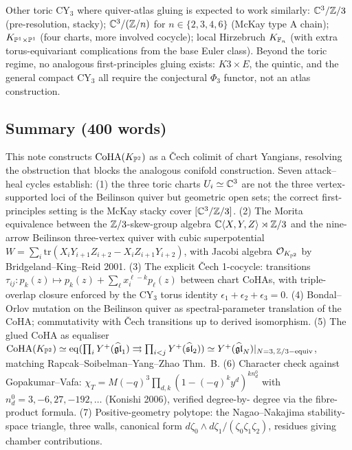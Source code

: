 Other toric CY$_3$ where quiver-atlas gluing is expected to work
similarly: $\mathbb{C}^3/\mathbb{Z}/3$ (pre-resolution, stacky); $\mathbb{C}^3/(\mathbb{Z}/n)$ for
$n\in\{2,3,4,6\}$ (McKay type A chain); $K_{\mathbb{P}^1\times\mathbb{P}^1}$ (four
charts, more involved cocycle); local Hirzebruch $K_{\mathbb{F}_n}$ (with
extra torus-equivariant complications from the base Euler class).
Beyond the toric regime, no analogous first-principles gluing exists:
$K3\times E$, the quintic, and the general compact CY$_3$ all require
the conjectural $\Phi_3$ functor, not an atlas construction.

\subsection*{Summary (400 words)}

This note constructs $\mathrm{CoHA}(K_{\mathbb{P}^2})$ as a \v Cech colimit of chart
Yangians, resolving the obstruction that blocks the analogous conifold
construction. Seven attack--heal cycles establish: (1) the three toric
charts $U_i\simeq\mathbb{C}^3$ are not the three vertex-supported loci of the
Beilinson quiver but geometric open sets; the correct first-principles
setting is the McKay stacky cover $[\mathbb{C}^3/\mathbb{Z}/3]$. (2) The Morita
equivalence between the $\mathbb{Z}/3$-skew-group algebra
$\mathbb{C}\langle X,Y,Z\rangle\rtimes\mathbb{Z}/3$ and the nine-arrow Beilinson
three-vertex quiver with cubic superpotential $W=\sum_i\mathrm{tr}(X_iY_{i+1}Z_{i+2}-X_iZ_{i+1}Y_{i+2})$,
with Jacobi algebra $\mathcal{O}_{K_{\mathbb{P}^2}}$ by Bridgeland--King--Reid 2001.
(3) The explicit \v Cech 1-cocycle: transitions
$\tau_{ij}:p_k(z)\mapsto p_k(z)+\sum_\ell x_i^{\ell-k}p_\ell(z)$
between chart CoHAs, with triple-overlap closure enforced by the
CY$_3$ torus identity $\epsilon_1+\epsilon_2+\epsilon_3=0$. (4)
Bondal--Orlov mutation on the Beilinson quiver as spectral-parameter
translation of the CoHA; commutativity with \v Cech transitions up to
derived isomorphism. (5) The glued CoHA as equaliser
$\mathrm{CoHA}(K_{\mathbb{P}^2})\simeq\mathrm{eq}(\prod_iY^+(\widehat{\mathfrak{gl}}_1)\rightrightarrows
\prod_{i<j}Y^+(\widehat{\mathfrak{sl}}_2))\simeq Y^+(\widehat{\mathfrak{gl}}_N)|_{N=3,\,\mathbb{Z}/3\mathrm{-equiv}}$,
matching Rapcak--Soibelman--Yang--Zhao Thm.\ B. (6) Character check
against Gopakumar--Vafa: $\chi_T=M(-q)^3\prod_{d,k}(1-(-q)^ky^d)^{k n_d^0}$
with $n_d^0=3,-6,27,-192,\ldots$ (Konishi 2006), verified degree-by-
degree via the fibre-product formula. (7) Positive-geometry polytope:
the Nagao--Nakajima stability-space triangle, three walls, canonical
form $d\zeta_0\wedge d\zeta_1/(\zeta_0\zeta_1\zeta_2)$, residues giving
chamber contributions.

